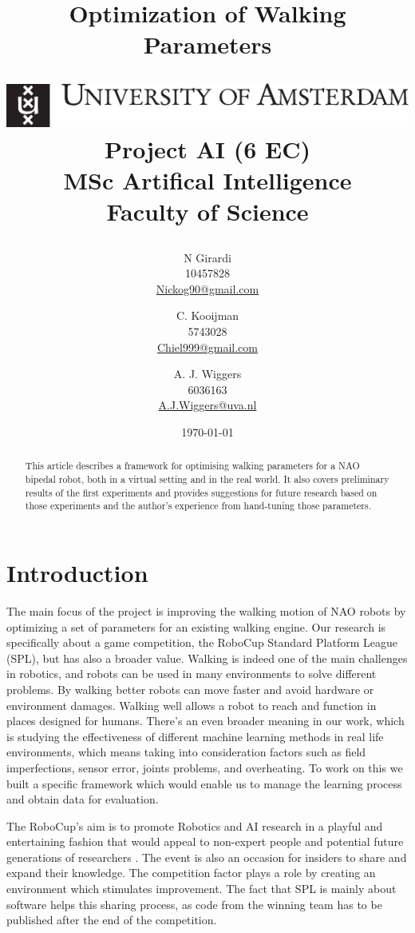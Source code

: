 \documentclass[a4paper, twocolumn]{article}
\title{Optimization of Walking Parameters\\
\vspace{.5em}
\begin{center}
	\includegraphics[scale=.8]{images/uva}\\ \normalsize
	Project AI (6 EC)\vspace{1em}\\MSc Artifical Intelligence\\Faculty of Science\\ \vspace{.2em}
\end{center}
}
\author{
N Girardi\\10457828\\\url{Nickog90@gmail.com} \and
C. Kooijman\\5743028\\\url{Chiel999@gmail.com} \and
A. J. Wiggers\\6036163\\\url{A.J.Wiggers@uva.nl}
}
\date{\today}
\begin{document}
\maketitle


\begin{abstract}
	This article describes a framework for optimising walking parameters for a
	NAO bipedal robot, both in a virtual setting and in the real world. It also
	covers preliminary results of the first experiments and provides
	suggestions for future research based on those experiments and the author's
	experience from hand-tuning those parameters.
\end{abstract}

\section{Introduction}
The main focus of the project is improving the walking motion of NAO robots by
optimizing a set of parameters for an existing walking engine. Our research is
specifically about a game competition, the RoboCup Standard Platform League
(SPL), but has also a broader value. Walking is indeed one of the main
challenges in robotics, and robots can be used in many environments to solve
different problems. By walking better robots can move faster and avoid hardware
or environment damages. Walking well allows a robot to reach and function in
places designed for humans. There's an even broader meaning in our work, which
is studying the effectiveness of different machine learning methods in real
life environments, which means taking into consideration factors such as field
imperfections, sensor error, joints problems, and overheating. To work on this
we built a specific framework which would enable us to manage the learning
process and obtain data for evaluation. 

The RoboCup's aim is to promote Robotics and AI research in a playful and
entertaining fashion that would appeal to non-expert people and potential
future generations of researchers \citep{kitano1997robocup}. The event is also
an occasion for insiders to share and expand their knowledge. The competition
factor plays a role by creating an environment which stimulates improvement.
The fact that SPL is mainly about software helps this sharing process, as code
from the winning team has to be published after the end of the competition. 
\end{document}
